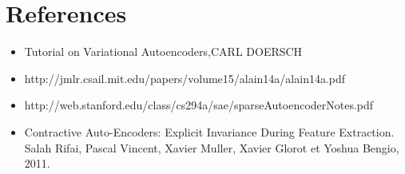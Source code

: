 \documentclass[xcolor=pdftex,dvipsnames,table,mathserif]{beamer}
\begin{document}
\section{References}
\begin{frame}
\begin{itemize}
\item Tutorial on Variational Autoencoders,CARL DOERSCH
\item http://jmlr.csail.mit.edu/papers/volume15/alain14a/alain14a.pdf
\item http://web.stanford.edu/class/cs294a/sae/sparseAutoencoderNotes.pdf
\item Contractive Auto-Encoders: Explicit Invariance During Feature Extraction.
Salah Rifai, Pascal Vincent, Xavier Muller, Xavier Glorot et Yoshua Bengio, 2011.
\end{itemize}
\end{frame}


\end{document}
